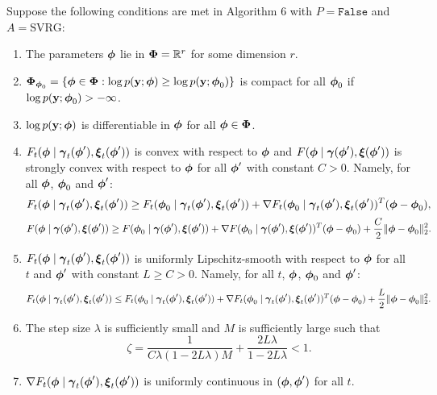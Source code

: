 \begin{theorem}

    Suppose the following conditions are met in Algorithm 6 with $P = \texttt{False}$ and $A = \text{SVRG}$:
    
    \begin{enumerate}
        \item The parameters $\boldsymbol{\phi}$ lie in $\boldsymbol{\Phi} = \mathbb{R}^r$ for some dimension $r$.
        \item $\boldsymbol{\Phi}_{\boldsymbol{\phi}_0} = \{\boldsymbol{\phi} \in \boldsymbol{\Phi}: \log p(\mathbf{y};\boldsymbol{\phi}) \geq \log p(\mathbf{y};\boldsymbol{\phi}_0)\}$ is compact for all $\boldsymbol{\phi}_0$ if $\log p(\mathbf{y};\boldsymbol{\phi}_0) > -\infty$.
        \item $\log p(\mathbf{y};\boldsymbol{\phi})$ is differentiable in $\boldsymbol{\phi}$ for all $\boldsymbol{\phi} \in \boldsymbol{\Phi}$.
        \item $F_t(\boldsymbol{\phi} \mid \boldsymbol{\gamma}_t(\boldsymbol{\phi}'), \boldsymbol{\xi}_t(\boldsymbol{\phi}'))$ is convex with respect to $\boldsymbol{\phi}$ and $F(\boldsymbol{\phi} \mid \boldsymbol{\gamma}(\boldsymbol{\phi}'), \boldsymbol{\xi}(\boldsymbol{\phi}'))$ is strongly convex with respect to $\boldsymbol{\phi}$ for all $\boldsymbol{\phi}'$ with constant $C > 0$. Namely, for all $\boldsymbol{\phi}$, $\boldsymbol{\phi}_0$ and $\boldsymbol{\phi}'$:
        \small
        \begin{equation}
            F_t(\boldsymbol{\phi} \mid \boldsymbol{\gamma}_t(\boldsymbol{\phi}'), \boldsymbol{\xi}_t(\boldsymbol{\phi}')) \geq F_t(\boldsymbol{\phi}_0 \mid \boldsymbol{\gamma}_t(\boldsymbol{\phi}'), \boldsymbol{\xi}_t(\boldsymbol{\phi}')) + \nabla F_t(\boldsymbol{\phi}_0 \mid \boldsymbol{\gamma}_t(\boldsymbol{\phi}'), \boldsymbol{\xi}_t(\boldsymbol{\phi}'))^T(\boldsymbol{\phi}-\boldsymbol{\phi}_0),
        \end{equation}
        \begin{equation}
            F(\boldsymbol{\phi} \mid \boldsymbol{\gamma}(\boldsymbol{\phi}'), \boldsymbol{\xi}(\boldsymbol{\phi}')) \geq F(\boldsymbol{\phi}_0 \mid \boldsymbol{\gamma}(\boldsymbol{\phi}'), \boldsymbol{\xi}(\boldsymbol{\phi}')) + \nabla F(\boldsymbol{\phi}_0 \mid \boldsymbol{\gamma}(\boldsymbol{\phi}'), \boldsymbol{\xi}(\boldsymbol{\phi}'))^T(\boldsymbol{\phi}-\boldsymbol{\phi}_0) + \frac{C}{2} \|\boldsymbol{\phi} - \boldsymbol{\phi}_0\|_2^2.
        \end{equation}
        \normalsize
        \item $F_t(\boldsymbol{\phi} \mid \boldsymbol{\gamma}_t(\boldsymbol{\phi}'), \boldsymbol{\xi}_t(\boldsymbol{\phi}'))$ is uniformly Lipschitz-smooth with respect to $\boldsymbol{\phi}$ for all $t$ and $\boldsymbol{\phi}'$ with constant $L \geq C > 0$. Namely, for all $t$, $\boldsymbol{\phi}$, $\boldsymbol{\phi}_0$ and $\boldsymbol{\phi}'$:
        \small
        \begin{equation}
            F_t(\boldsymbol{\phi} \mid \boldsymbol{\gamma}_t(\boldsymbol{\phi}'), \boldsymbol{\xi}_t(\boldsymbol{\phi}')) \leq F_t(\boldsymbol{\phi}_0 \mid \boldsymbol{\gamma}_t(\boldsymbol{\phi}'), \boldsymbol{\xi}_t(\boldsymbol{\phi}')) + \nabla F_t(\boldsymbol{\phi}_0 \mid \boldsymbol{\gamma}_t(\boldsymbol{\phi}'), \boldsymbol{\xi}_t(\boldsymbol{\phi}'))^T(\boldsymbol{\phi} - \boldsymbol{\phi}_0) + \frac{L}{2} \| \boldsymbol{\phi} - \boldsymbol{\phi}_0 \|_2^2.
        \end{equation}
        \normalsize
        \item The step size $\lambda$ is sufficiently small and $M$ is sufficiently large such that
        \begin{equation}
            \zeta = \frac{1}{C \lambda(1-2L\lambda)M} + \frac{2L\lambda}{1-2L\lambda} < 1.
        \end{equation}
        \item $\nabla F_t(\boldsymbol{\phi} \mid \boldsymbol{\gamma}_t(\boldsymbol{\phi}'), \boldsymbol{\xi}_t(\boldsymbol{\phi}'))$ is uniformly continuous in $(\boldsymbol{\phi},\boldsymbol{\phi}')$ for all $t$.
    \end{enumerate}
    

\end{theorem}

